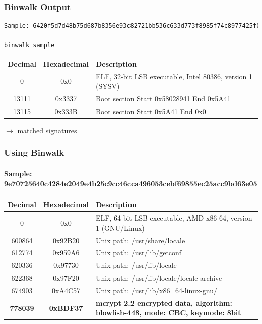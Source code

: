 \begin{frame}[fragile]
\frametitle{Binwalk Output}

\begin{lstlisting}[language=bash, basicstyle=\ttfamily, breaklines=true]
Sample: 6420f5d7d48b75d687b8356e93c82721bb536c633d773f8985f74c8977425f04

binwalk sample
\end{lstlisting}

\begin{tabular}{ccp{}}
\textbf{Decimal} & \textbf{Hexadecimal} & \textbf{Description}\\
0                & 0x0                  & ELF, 32-bit LSB executable, Intel 80386, version 1 (SYSV) \\
13111            & 0x3337               & Boot section Start 0x58028941 End 0x5A41 \\
13115            & 0x333B               & Boot section Start 0x5A41 End 0x0 \\
\end{tabular}

\vspace{1cm}

$\to$ matched signatures
\end{frame}

\begin{frame}[fragile]
\frametitle{Using Binwalk}
\framesubtitle{Sample: 9e70725640c4284e2049e4b25c9cc46cca496053cebf69855ec25acc9bd63e05}
\begin{tabular}{|c|c|p{}|}
\hline
\textbf{Decimal} & \textbf{Hexadecimal} & \textbf{Description} \\ \hline
0                & 0x0                  & ELF, 64-bit LSB executable, AMD x86-64, version 1 (GNU/Linux) \\ \hline
600864           & 0x92B20              & Unix path: /usr/share/locale \\ \hline
612774           & 0x959A6              & Unix path: /usr/lib/getconf \\ \hline
620336           & 0x97730              & Unix path: /usr/lib/locale \\ \hline
622368           & 0x97F20              & Unix path: /usr/lib/locale/locale-archive \\ \hline
674903           & 0xA4C57              & Unix path: /usr/lib/x86\_64-linux-gnu/ \\ \hline

\textbf{778039}           & \textbf{0xBDF37}              & \textbf{mcrypt 2.2 encrypted data, algorithm: blowfish-448, mode: CBC, keymode: 8bit} \\ \hline
\end{tabular}

\end{frame}

